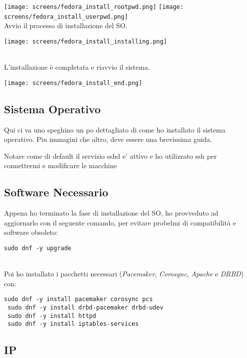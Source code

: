 \texttt{[image: screens/fedora\_install\_rootpwd.png]}
\texttt{[image: screens/fedora\_install\_userpwd.png]}
\ \\
Avvio il processo di installazione del SO.

\begin{center}
	\texttt{[image: screens/fedora\_install\_installing.png]}
\end{center}
\ \\
L'installazione \`{e} completata e riavvio il sistema.

\begin{center}
	\texttt{[image: screens/fedora\_install\_end.png]}
\end{center}

\subsection{Sistema Operativo}

Qui ci va uno speghino un po dettagliato di come ho installato il sistema operativo. Piu immagini che altro, deve essere una brevissima guida.

Notare come di default il servizio sshd e' attivo e ho utilizzato ssh per connettermi e modificare le macchine

\subsection{Software Necessario}

Appena ho terminato la fase di installazione del SO, ho provveduto ad aggiornarlo con il seguente comando, per evitare probelmi di compatibilit\`{a} e software obsoleto:

\begin{lstlisting}[style=cmd]
 sudo dnf -y upgrade
\end{lstlisting} 
\ \\
Poi ho installato i pacchetti necessari (\textit{Pacemaker}, \textit{Corosync}, \textit{Apache} e \textit{DRBD}) con: 

\begin{lstlisting}[style=cmd]
 sudo dnf -y install pacemaker corosync pcs
 sudo dnf -y install drbd-pacemaker drbd-udev
 sudo dnf -y install httpd
 sudo dnf -y install iptables-services
\end{lstlisting} 

\subsection{IP}

